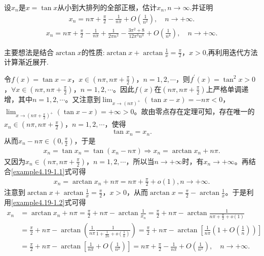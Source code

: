 \documentclass[../../main.tex]{subfiles}%
\begin{document}
\begin{example}
设\(x_n\)是\(x = \tan x\)从小到大排列的全部正根，估计$x_n,n\to \infty$.并证明
\begin{align*}
x_n = n\pi +\frac{\pi}{2}-\frac{1}{n\pi}+O(\frac{1}{n^2}),\quad n\rightarrow +\infty .
\end{align*}
\begin{align*}
x_n=n\pi +\frac{\pi}{2}-\frac{1}{n\pi}+\frac{1}{2\pi n^2}-\frac{3\pi ^2+8}{12\pi ^3n^3}+O\left( \frac{1}{n^4} \right) ,\quad n\rightarrow +\infty .
\end{align*}
\end{example}
\begin{note}
主要想法是结合$\arctan x$的性质:\(\arctan x + \arctan\frac{1}{x} = \frac{\pi}{2}\)，\(x > 0\),再利用迭代方法计算渐近展开.
\end{note}
\begin{solution}
令\(f(x)=\tan x - x\)，\(x\in(n\pi, n\pi + \frac{\pi}{2})\)，\(n = 1, 2, \cdots\)，则\(f^\prime(x)=\tan^2 x > 0\)，\(\forall x\in(n\pi, n\pi + \frac{\pi}{2})\)，\(n = 1, 2, \cdots\)。因此\(f(x)\)在\((n\pi, n\pi + \frac{\pi}{2})\)上严格单调递增，其中\(n = 1, 2, \cdots\)。又注意到\(\lim_{x\rightarrow (n\pi)^+}(\tan x - x)= -n\pi < 0\)，\(\lim_{x\rightarrow (n\pi + \frac{\pi}{2})^+}(\tan x - x)= +\infty > 0\)。故由零点存在定理可知，存在唯一的\(x_n\in(n\pi, n\pi + \frac{\pi}{2})\)，\(n = 1, 2, \cdots\)，使得
\[
\tan x_n = x_n.
\]
从而\(x_n - n\pi\in(0, \frac{\pi}{2})\)，于是
\begin{align}\label{example4.19-1.1}
x_n = \tan x_n = \tan(x_n - n\pi) \Longrightarrow x_n = \arctan x_n + n\pi.  
\end{align}
又因为\(x_n\in(n\pi, n\pi + \frac{\pi}{2})\)，\(n = 1, 2, \cdots\)，所以当\(n\rightarrow +\infty\)时，有\(x_n\rightarrow +\infty\)。再结合\eqref{example4.19-1.1}式可得
\begin{align}\label{example4.19-1.2}
x_n = \arctan x_n + n\pi = n\pi + \frac{\pi}{2} + o(1), n\rightarrow +\infty.
\end{align}
注意到\(\arctan x + \arctan\frac{1}{x} = \frac{\pi}{2}\)，\(x > 0\)，从而\(\arctan x = \frac{\pi}{2} - \arctan\frac{1}{x}\)。于是利用\eqref{example4.19-1.2}式可得
\begin{align}
x_n&=\arctan x_n+n\pi =\frac{\pi}{2}+n\pi -\arctan \frac{1}{x_n}=\frac{\pi}{2}+n\pi -\arctan \frac{1}{n\pi +\frac{\pi}{2}+o(1)}\nonumber
\\
&=\frac{\pi}{2}+n\pi -\arctan \left( \frac{1}{n\pi}\frac{1}{1+\frac{1}{2n}+o(\frac{1}{n})} \right) =\frac{\pi}{2}+n\pi -\arctan \left[ \frac{1}{n\pi}\left( 1+O(\frac{1}{n}) \right) \right] \nonumber
\\
&=\frac{\pi}{2}+n\pi -\arctan \left[ \frac{1}{n\pi}+O(\frac{1}{n^2}) \right] = n\pi +\frac{\pi}{2}-\frac{1}{n\pi}+O(\frac{1}{n^2}),\quad n\rightarrow +\infty .\label{eq::::HIOIOWIOJDJIOWHJFHUQPPPP}
\end{align}


\end{solution}
\end{document}
